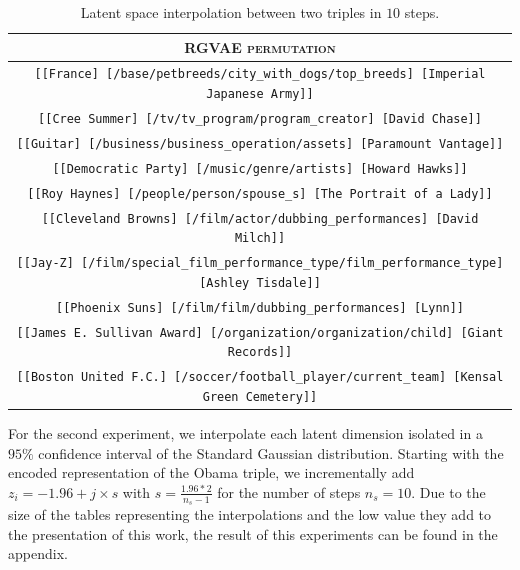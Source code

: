 \begin{table}[H]
  \centering
  \begin{tabular}{|c|}
  \hline
  \rowcolor[HTML]{EFEFEF} 
  \textsc{RGVAE permutation}\\ \hline
  \texttt{[[France] [/base/petbreeds/city\_with\_dogs/top\_breeds] [Imperial Japanese Army]]}\\
  \texttt{[[Cree Summer] [/tv/tv\_program/program\_creator] [David Chase]]}\\
  \texttt{[[Guitar] [/business/business\_operation/assets] [Paramount Vantage]]}\\
  \texttt{[[Democratic Party] [/music/genre/artists] [Howard Hawks]]}\\
  \texttt{[[Roy Haynes] [/people/person/spouse\_s] [The Portrait of a Lady]]}\\
  \texttt{[[Cleveland Browns] [/film/actor/dubbing\_performances] [David Milch]]}\\
  \texttt{[[Jay-Z] [/film/special\_film\_performance\_type/film\_performance\_type] [Ashley Tisdale]]}\\
  \texttt{[[Phoenix Suns] [/film/film/dubbing\_performances] [Lynn]]}\\
  \texttt{[[James E. Sullivan Award] [/organization/organization/child] [Giant Records]]}\\
  \texttt{[[Boston United F.C.] [/soccer/football\_player/current\_team] [Kensal Green Cemetery]]}\\  
  \hline
  \end{tabular}
\caption{Latent space interpolation between two triples in $10$ steps.}
\label{tab5:ipbtw2}
\end{table}

For the second experiment, we interpolate each latent dimension isolated in a $95\%$ confidence interval of the Standard Gaussian distribution. Starting with the encoded representation of the Obama triple, we incrementally add $z_{i} = -1.96 + j \times s$ with $s = \frac{1.96 * 2}{n_s-1}$ for the number of steps $n_s = 10$. Due to the size of the tables representing the interpolations and the low value they add to the presentation of this work, the result of this experiments can be found in the appendix.





